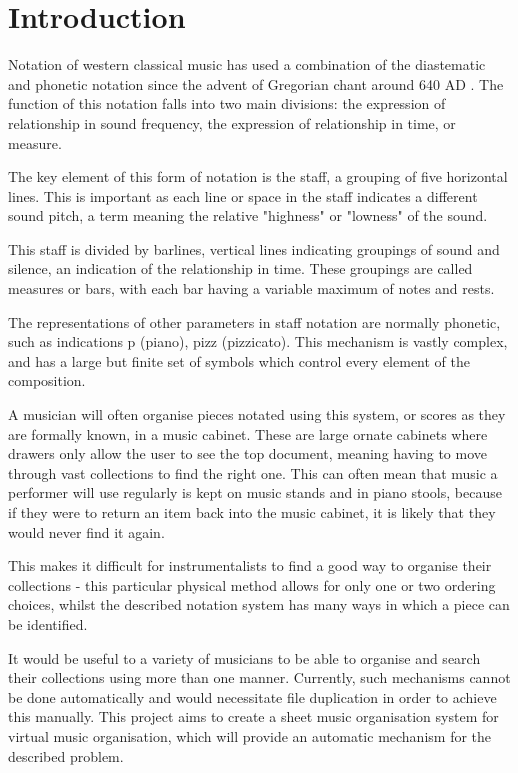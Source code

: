 \section{Introduction}
Notation of western classical music has used a combination of the diastematic and phonetic notation \parencite{RRastall} since the advent of Gregorian chant around 640 AD \parencite{RTaruskin}. The function of this notation falls into two main divisions: the expression of relationship in sound frequency, the expression of relationship in time, or measure. \parencite{oxHistory}

The key element of this form of notation is the staff, a grouping of five horizontal lines. This is important as each line or space in the staff indicates a different sound pitch, a term meaning the relative "highness" or "lowness" of the sound. \parencite{classroom} 

This staff is divided by barlines, vertical lines indicating groupings of sound and silence, an indication of the relationship in time. These groupings are called measures or bars, with each bar having a variable maximum of notes and rests. 

The representations of other parameters in staff notation are normally phonetic, such as indications p (piano), pizz (pizzicato). \parencite{RRastall} This mechanism is vastly complex, and has a large but finite set of symbols which control every element of the composition.

A musician will often organise pieces notated using this system, or scores as they are formally known, in a music cabinet. These are large ornate cabinets where drawers only allow the user to see the top document, meaning having to move through vast collections to find the right one. This can often mean that music a performer will use regularly is kept on music stands and in piano stools, because if they were to return an item back into the music cabinet, it is likely that they would never find it again.\parencite{SheetMusicRant}

This makes it difficult for instrumentalists to find a good way to organise their collections - this particular physical method allows for only one or two ordering choices, whilst the described notation system has many ways in which a piece can be identified. 

It would be useful to a variety of musicians to be able to organise and search their collections using more than one manner. Currently, such mechanisms cannot be done automatically and would necessitate file duplication in order to achieve this manually. This project aims to create a sheet music organisation system for virtual music organisation, which will provide an automatic mechanism for the described problem.

